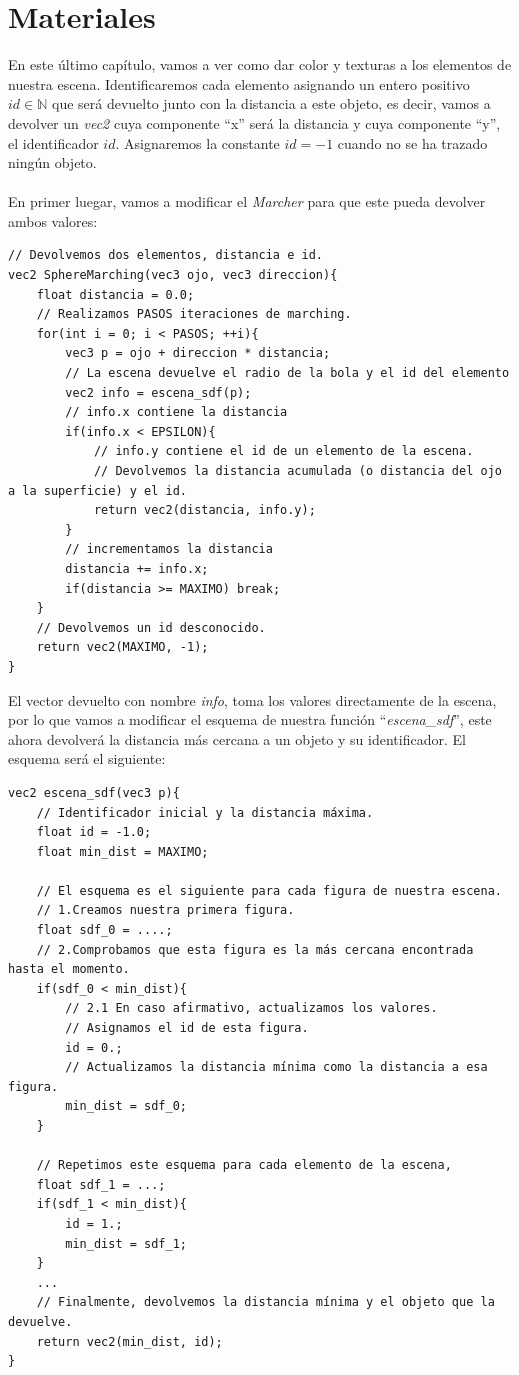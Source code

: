 \chapter{Materiales\label{ch:materiales}}
En este último capítulo, vamos a ver como dar color y texturas a los elementos de nuestra escena. Identificaremos cada elemento asignando un entero positivo \(id \in \mathbb{N}\) que será devuelto junto con la distancia a este objeto, es decir, vamos a devolver un \textit{vec2} cuya componente \enquote{x} será la distancia y cuya componente \enquote{y}, el identificador \(id\). Asignaremos la constante \(id=-1\) cuando no se ha trazado ningún objeto.\\\\
En primer luegar, vamos a modificar el \textit{Marcher} para que este pueda devolver ambos valores:

\begin{lstlisting}
// Devolvemos dos elementos, distancia e id.
vec2 SphereMarching(vec3 ojo, vec3 direccion){
    float distancia = 0.0;
    // Realizamos PASOS iteraciones de marching.
    for(int i = 0; i < PASOS; ++i){
        vec3 p = ojo + direccion * distancia;
        // La escena devuelve el radio de la bola y el id del elemento
        vec2 info = escena_sdf(p);
        // info.x contiene la distancia
        if(info.x < EPSILON){
            // info.y contiene el id de un elemento de la escena.
            // Devolvemos la distancia acumulada (o distancia del ojo a la superficie) y el id.
            return vec2(distancia, info.y);
        }
        // incrementamos la distancia
        distancia += info.x;
        if(distancia >= MAXIMO) break;
    }
    // Devolvemos un id desconocido.
    return vec2(MAXIMO, -1);
}
\end{lstlisting}

El vector devuelto con nombre \textit{info}, toma los valores directamente de la escena, por lo que vamos a modificar el esquema de nuestra función \enquote{\textit{escena\_sdf}}, este ahora devolverá la distancia más cercana a un objeto y su identificador. El esquema será el siguiente:

\begin{lstlisting}
vec2 escena_sdf(vec3 p){
    // Identificador inicial y la distancia máxima.
    float id = -1.0;
    float min_dist = MAXIMO;
    
    // El esquema es el siguiente para cada figura de nuestra escena.
    // 1.Creamos nuestra primera figura.
    float sdf_0 = ....;
    // 2.Comprobamos que esta figura es la más cercana encontrada hasta el momento.
    if(sdf_0 < min_dist){
        // 2.1 En caso afirmativo, actualizamos los valores.
        // Asignamos el id de esta figura.
        id = 0.;
        // Actualizamos la distancia mínima como la distancia a esa figura.
        min_dist = sdf_0;
    }
    
    // Repetimos este esquema para cada elemento de la escena,
    float sdf_1 = ...;
    if(sdf_1 < min_dist){
        id = 1.;
        min_dist = sdf_1;
    }
    ...
    // Finalmente, devolvemos la distancia mínima y el objeto que la devuelve.
    return vec2(min_dist, id);
}
\end{lstlisting}

